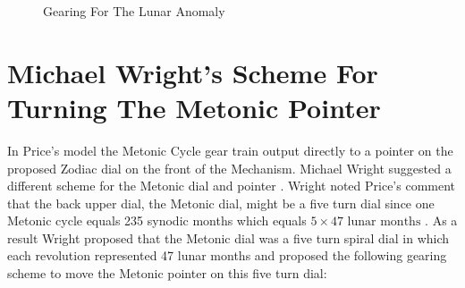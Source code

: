 \documentclass{article}
\theoremstyle{definition}
\begin{document}
\bigskip
\begin{figure}[H]
\caption{Gearing For The Lunar Anomaly \cite{youtube:freeth2021}}
\label{fig:gearing_for_the_lunar_anomaly}
\end{figure}


\bigskip
\section{Michael Wright's Scheme For Turning The Metonic Pointer}
In Price's model the Metonic Cycle gear train output directly to
a pointer on the proposed Zodiac dial on the front of the
Mechanism. Michael Wright suggested a different scheme for the
Metonic dial and pointer \cite{Wright2005a}. Wright noted Price's
comment that the back upper dial, the Metonic dial, might be a
five turn dial since one Metonic cycle equals 235 synodic months
which equals $5 \times 47 \text{ lunar months}$
\cite{gears_from_the_greeks}.  As a result Wright proposed that
the Metonic dial was a five turn spiral dial in which each
revolution represented 47 lunar months and proposed the following
gearing scheme to move the Metonic pointer on this five turn
dial:
\end{document}
